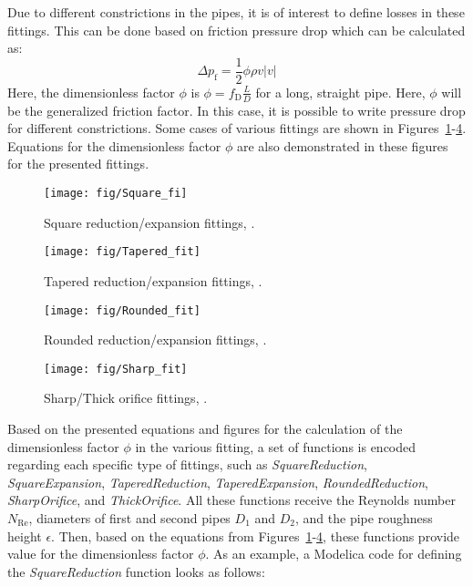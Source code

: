\documentclass[%
]{USN-PhD}
\begin{document}
Due to different constrictions in the pipes, it is of interest to define losses in these fittings. This can be done based on friction pressure drop which can be calculated as:
\begin{equation}\label{eq:eq14}
\Delta p_\mathrm{f}=\frac{1}{2}\phi\rho v|v|
\end{equation}
Here, the dimensionless factor $\phi$ is $\phi=f_\mathrm{D}\frac{L}{D}$ for a long, straight pipe. Here, $\phi$ will be the generalized friction factor. In this case, it is possible to write pressure drop for different constrictions. Some cases of various fittings are shown in Figures~\ref{fig:fig3}-\ref{fig:fig6}. Equations for the dimensionless factor $\phi$  are also demonstrated in these figures for the presented fittings.
\begin{figure}[!ht]
  \centering
 \texttt{[image: fig/Square\_fi]}
 \caption{Square reduction/expansion fittings, \cite{LieL:18}.}
  \label{fig:fig3}
\end{figure}
\begin{figure}[!ht]
  \centering
 \texttt{[image: fig/Tapered\_fit]}
 \caption{Tapered reduction/expansion fittings, \cite{LieL:18}.}
  \label{fig:fig4}
\end{figure}
\begin{figure}[!ht]
  \centering
 \texttt{[image: fig/Rounded\_fit]}
 \caption{Rounded reduction/expansion fittings, \cite{LieL:18}.}
  \label{fig:fig5}
\end{figure}
\begin{figure}[!ht]
  \centering
 \texttt{[image: fig/Sharp\_fit]}
 \caption{Sharp/Thick orifice fittings, \cite{LieL:18}.}
  \label{fig:fig6}
\end{figure}

Based on the presented equations and figures for the calculation of the dimensionless factor $\phi$ in the various fitting, a set of functions is encoded regarding each specific type of fittings, such as \emph{SquareReduction}, \emph{SquareExpansion}, \emph{TaperedReduction}, \emph{TaperedExpansion}, \emph{RoundedReduction}, \emph{SharpOrifice}, and \emph{ThickOrifice}. All these functions receive the Reynolds number $N_\mathrm{Re}$, diameters of first and second pipes $D_1$ and $D_2$, and the pipe roughness height $\epsilon$. Then, based on the equations from Figures~\ref{fig:fig3}-\ref{fig:fig6}, these functions provide value for the dimensionless factor $\phi$. As an example, a Modelica code for defining the \emph{SquareReduction} function looks as follows:
\end{document}
